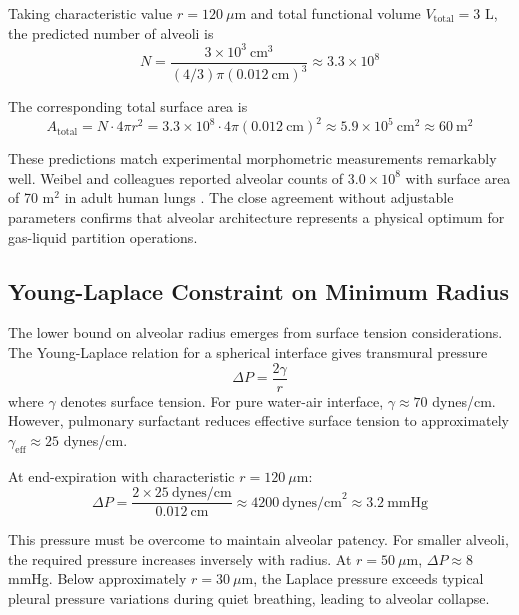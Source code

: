 Taking characteristic value $r = 120~\mu$m and total functional volume $V_{\mathrm{total}} = 3$ L, the predicted number of alveoli is
\begin{equation}
N = \frac{3 \times 10^{3}~\mathrm{cm}^{3}}{(4/3)\pi(0.012~\mathrm{cm})^{3}} \approx 3.3 \times 10^{8}
\end{equation}

The corresponding total surface area is
\begin{equation}
A_{\mathrm{total}} = N \cdot 4\pi r^{2} = 3.3 \times 10^{8} \cdot 4\pi(0.012~\mathrm{cm})^{2} \approx 5.9 \times 10^{5}~\mathrm{cm}^{2} \approx 60~\mathrm{m}^{2}
\end{equation}

These predictions match experimental morphometric measurements remarkably well. Weibel and colleagues reported alveolar counts of $3.0 \times 10^{8}$ with surface area of 70 m$^{2}$ in adult human lungs \cite{weibel1963morphometry}. The close agreement without adjustable parameters confirms that alveolar architecture represents a physical optimum for gas-liquid partition operations.

\subsection{Young-Laplace Constraint on Minimum Radius}

The lower bound on alveolar radius emerges from surface tension considerations. The Young-Laplace relation for a spherical interface gives transmural pressure
\begin{equation}
\Delta P = \frac{2\gamma}{r}
\end{equation}
where $\gamma$ denotes surface tension. For pure water-air interface, $\gamma \approx 70$ dynes/cm. However, pulmonary surfactant reduces effective surface tension to approximately $\gamma_{\mathrm{eff}} \approx 25$ dynes/cm.

At end-expiration with characteristic $r = 120~\mu$m:
\begin{equation}
\Delta P = \frac{2 \times 25~\mathrm{dynes/cm}}{0.012~\mathrm{cm}} \approx 4200~\mathrm{dynes/cm}^{2} \approx 3.2~\mathrm{mmHg}
\end{equation}

This pressure must be overcome to maintain alveolar patency. For smaller alveoli, the required pressure increases inversely with radius. At $r = 50~\mu$m, $\Delta P \approx 8$ mmHg. Below approximately $r = 30~\mu$m, the Laplace pressure exceeds typical pleural pressure variations during quiet breathing, leading to alveolar collapse.


